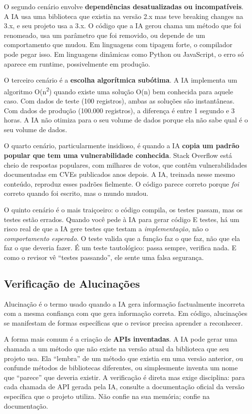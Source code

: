 O segundo cenário envolve \textbf{dependências desatualizadas ou incompatíveis}. A IA
usa uma biblioteca que existia na versão 2.x mas teve breaking changes na 3.x, e
seu projeto usa a 3.x. O código que a IA gerou chama um método que foi renomeado, usa
um parâmetro que foi removido, ou depende de um comportamento que mudou. Em linguagens
com tipagem forte, o compilador pode pegar isso. Em linguagens dinâmicas como Python
ou JavaScript, o erro só aparece em runtime, possivelmente em produção.

O terceiro cenário é a \textbf{escolha algorítmica subótima}. A IA implementa um
algoritmo O(n\textsuperscript{2}) quando existe uma solução O(n) bem conhecida para
aquele caso. Com dados de teste (100 registros), ambas as soluções são instantâneas.
Com dados de produção (100.000 registros), a diferença é entre 1 segundo e 3 horas.
A IA não otimiza para o seu volume de dados porque ela não sabe qual é o seu volume
de dados.

O quarto cenário, particularmente insidioso, é quando a IA \textbf{copia um padrão
popular que tem uma vulnerabilidade conhecida}. Stack Overflow está cheio de
respostas populares, com milhares de votos, que contêm vulnerabilidades
documentadas em CVEs publicados anos depois. A IA, treinada nesse mesmo conteúdo,
reproduz esses padrões fielmente. O código parece correto porque \textit{foi}
correto quando foi escrito, mas o mundo mudou.

O quinto cenário é o mais traiçoeiro: o código compila, os testes passam, mas os
testes estão errados. Quando você pede à IA para gerar código E testes, há um risco
real de que a IA gere testes que testam a \textit{implementação}, não o
\textit{comportamento esperado}. O teste valida que a função faz o que faz, não que
ela faz o que deveria fazer. É um teste tautológico: passa sempre, verifica nada. E
como o revisor vê ``testes passando'', ele sente uma falsa segurança.

\subsection{Verificação de Alucinações}

Alucinação é o termo usado quando a IA gera informação factualmente incorreta com
a mesma confiança com que gera informação correta. Em código, alucinações se
manifestam de formas específicas que o revisor precisa aprender a reconhecer.

A forma mais comum é a criação de \textbf{APIs inventadas}. A IA pode gerar uma
chamada a um método que não existe na versão atual da biblioteca que seu projeto usa.
Ela ``lembra'' de um método que existia em uma versão anterior, ou confunde métodos
de bibliotecas diferentes, ou simplesmente inventa um nome que ``parece'' que deveria
existir. A verificação é direta mas exige disciplina: para cada chamada de API gerada
pela IA, consulte a documentação oficial da versão específica que o projeto utiliza.
Não confie na sua memória; confie na documentação.

